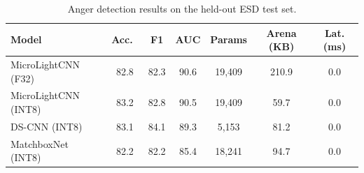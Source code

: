 \begin{table}[t]
\centering
\caption{Anger detection results on the held-out ESD test set.}
\label{tab:anger_results}
\begin{tabular}{lcccccc}
\toprule
Model & Acc.\ & F1 & AUC & Params & Arena (KB) & Lat. (ms) \\
\midrule
MicroLightCNN (F32) & 82.8 & 82.3 & 90.6 & 19,409 & 210.9 & 0.0 \\
MicroLightCNN (INT8) & 83.2 & 82.8 & 90.5 & 19,409 & 59.7 & 0.0 \\
DS-CNN (INT8) & 83.1 & 84.1 & 89.3 & 5,153 & 81.2 & 0.0 \\
MatchboxNet (INT8) & 82.2 & 82.2 & 85.4 & 18,241 & 94.7 & 0.0 \\
\bottomrule
\end{tabular}
\end{table}
